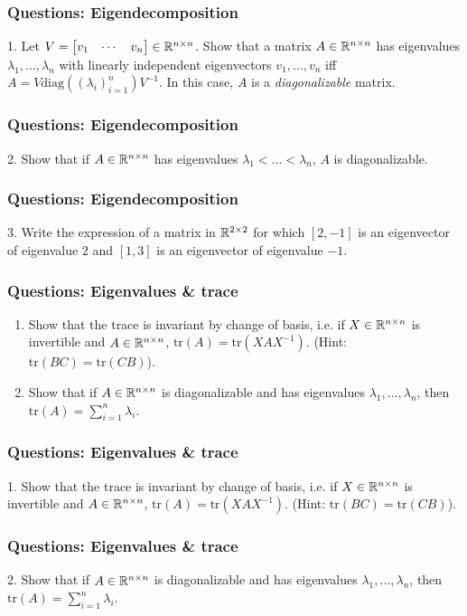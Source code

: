 \documentclass{beamer}
\begin{document}
\begin{frame}[t]
\frametitle{Questions: Eigendecomposition}
1. Let $V = \begin{bmatrix} v_1 & \cdots & v_n \end{bmatrix} \in \mathbb{R}^{n \times n}$. Show that a matrix $A \in \mathbb{R}^{n \times n}$ has eigenvalues $\lambda_1, \dots, \lambda_n$ with linearly independent eigenvectors $v_1, \dots, v_n$ iff $A = V \text{diag}((\lambda_i)_{i=1}^n) V^{-1}$. In this case, $A$ is a \emph{diagonalizable} matrix.
\pause
\end{frame}

\begin{frame}[t]
\frametitle{Questions: Eigendecomposition}
2. Show that if $A \in \mathbb{R}^{n \times n}$ has eigenvalues $\lambda_1 < \dots < \lambda_n$, $A$ is diagonalizable.
\end{frame}

\begin{frame}[t]
\frametitle{Questions: Eigendecomposition}
3. Write the expression of a matrix in $\mathbb{R}^{2 \times 2}$ for which $[2,-1]$ is an eigenvector of eigenvalue $2$ and $[1,3]$ is an eigenvector of eigenvalue $-1$.
\pause
\end{frame}

\begin{frame}[t]
\frametitle{Questions: Eigenvalues \& trace}
\begin{enumerate}
\item Show that the trace is invariant by change of basis, i.e. if $X \in \mathbb{R}^{n \times n}$ is invertible and $A \in \mathbb{R}^{n \times n}$, $\text{tr}(A) = \text{tr}(X A X^{-1})$. (Hint: $\text{tr}(BC) = \text{tr}(CB)$).
\item Show that if $A \in \mathbb{R}^{n \times n}$ is diagonalizable and has eigenvalues $\lambda_1, \dots, \lambda_n$, then $\text{tr}(A) = \sum_{i=1}^n \lambda_i$.
\end{enumerate}
\end{frame}

\begin{frame}[t]
\frametitle{Questions: Eigenvalues \& trace}
1. Show that the trace is invariant by change of basis, i.e. if $X \in \mathbb{R}^{n \times n}$ is invertible and $A \in \mathbb{R}^{n \times n}$, $\text{tr}(A) = \text{tr}(X A X^{-1})$. (Hint: $\text{tr}(BC) = \text{tr}(CB)$).
\pause
\end{frame}

\begin{frame}[t]
\frametitle{Questions: Eigenvalues \& trace}
2. Show that if $A \in \mathbb{R}^{n \times n}$ is diagonalizable and has eigenvalues $\lambda_1, \dots, \lambda_n$, then $\text{tr}(A) = \sum_{i=1}^n \lambda_i$.
\pause
\end{frame}
\end{document}
